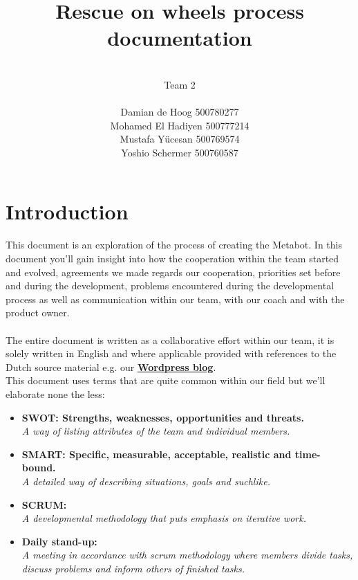 \documentclass[12pt]{article}
\begin{document}
	\title{\huge Rescue on wheels process documentation}
	\author{\\Team 2\\ \\Damian de Hoog 500780277\\Mohamed El Hadiyen 500777214\\Mustafa Y\"{u}cesan 500769574\\Yoshio Schermer 500760587 }
	\maketitle
	\newpage
	\tableofcontents
	\newpage
	\section{Introduction}
	This document is an exploration of the process of creating the Metabot. In this document you'll gain insight into how the cooperation within the team started and evolved, agreements we made regards our cooperation, priorities set before and during the development, problems encountered during the developmental process as well as communication within our team, with our coach and with the product owner.\\
	\\The entire document is written as a collaborative effort within our team, it is solely written in English and where applicable provided with references to the Dutch source material e.g. our \href{https://metabotsrow.wordpress.com/}{\textbf{Wordpress blog}}.\\
	This document uses terms that are quite common within our field but we'll elaborate none the less: 
	\begin{itemize}
		\item \textbf{SWOT: Strengths, weaknesses, opportunities and threats.} 
		\\\emph{A way of listing attributes of the team and individual members.}
		\item \textbf{SMART: Specific, measurable, acceptable, realistic and time-bound.}
		\\\emph{A detailed way of describing situations, goals and suchlike.}
		\item \textbf{SCRUM: }
		\\\emph{A developmental methodology that puts emphasis on iterative work.}
		\item \textbf{Daily stand-up: }
		\\\emph{A meeting in accordance with scrum methodology where members divide tasks, discuss problems and inform others of finished tasks.}
	\end{itemize}
	\newpage
\end{document}
